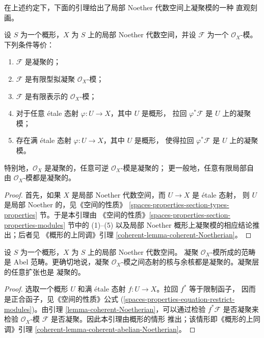 \medskip\noindent
在上述约定下，下面的引理给出了局部 Noether 代数空间上凝聚模的一种
直观刻画。

\begin{lemma}
\label{lemma-coherent-Noetherian}
设 $S$ 为一个概形，$X$ 为 $S$ 上的局部 Noether 代数空间，并设
$\mathcal{F}$ 为一个 $\mathcal{O}_X$-模。下列条件等价：
\begin{enumerate}
\item $\mathcal{F}$ 是凝聚的；
\item $\mathcal{F}$ 是有限型拟凝聚 $\mathcal{O}_X$-模；
\item $\mathcal{F}$ 是有限表示的 $\mathcal{O}_X$-模；
\item 对于任意 \'etale 态射 $\varphi : U \to X$，其中 $U$ 是概形，
拉回 $\varphi^*\mathcal{F}$ 是 $U$ 上的凝聚模；
\item 存在满 \'etale 态射 $\varphi : U \to X$，其中 $U$ 是概形，
使得拉回 $\varphi^*\mathcal{F}$ 是 $U$ 上的凝聚模。
\end{enumerate}
特别地，$\mathcal{O}_X$ 是凝聚的，任意可逆 $\mathcal{O}_X$-模是凝聚的；
更一般地，任意有限局部自由 $\mathcal{O}_X$-模都是凝聚的。
\end{lemma}

\begin{proof}
首先，如果 $X$ 是局部 Noether 代数空间，而 $U \to X$ 是 \'etale 态射，
则 $U$ 是局部 Noether 的，见《空间的性质》
\ref{spaces-properties-section-types-properties} 节。于是本引理由
《空间的性质》\ref{spaces-properties-section-properties-modules} 节中的
(1)--(5) 以及局部 Noether 概形上凝聚模的相应结论推出；后者见
《概形的上同调》引理 \ref{coherent-lemma-coherent-Noetherian}。
\end{proof}

\begin{lemma}
\label{lemma-coherent-abelian-Noetherian}
设 $S$ 为一个概形，$X$ 为 $S$ 上的局部 Noether 代数空间。
凝聚 $\mathcal{O}_X$-模所成的范畴是 Abel 范畴。更确切地说，凝聚
$\mathcal{O}_X$-模之间态射的核与余核都是凝聚的。凝聚层的任意扩张也是
凝聚的。
\end{lemma}

\begin{proof}
选取一个概形 $U$ 和满 \'etale 态射 $f : U \to X$。拉回 $f^*$ 等于限制函子，
因而是正合函子，见《空间的性质》公式
(\ref{spaces-properties-equation-restrict-modules})。由引理
\ref{lemma-coherent-Noetherian}，可以通过检验 $f^*\mathcal{F}$ 是否凝聚来
检验 $\mathcal{O}_X$-模 $\mathcal{F}$ 是否凝聚。因此本引理由概形的情形
推出；该情形即《概形的上同调》引理
\ref{coherent-lemma-coherent-abelian-Noetherian}。
\end{proof}


